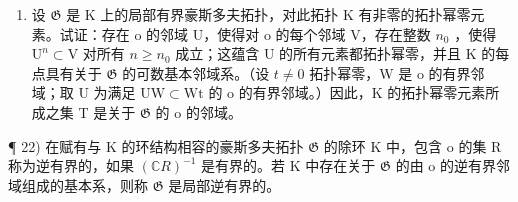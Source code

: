 \begin{enumerate}
\def\labelenumi{\alph{enumi})}
\setcounter{enumi}{1}
\tightlist
\item
  设 \(\mathfrak{G}\) 是 K 上的局部有界豪斯多夫拓扑，对此拓扑 K 有非零的拓扑幂零元素。试证：存在 o 的邻域 U，使得对 o 的每个邻域 V，存在整数 \(n_0\) ，使得 \(\mathrm{U}^n\subset \mathrm{V}\) 对所有 \(n\geqslant n_0\) 成立；这蕴含 U 的所有元素都拓扑幂零，并且 K 的每点具有关于 \(\mathfrak{G}\) 的可数基本邻域系。（设 \(t\neq 0\) 拓扑幂零，W 是 o 的有界邻域；取 U 为满足 \(\mathrm{UW}\subset \mathrm{Wt}\) 的 o 的有界邻域。）因此，K 的拓扑幂零元素所成之集 T 是关于 \(\mathfrak{G}\) 的 o 的邻域。
\end{enumerate}

¶ 22) 在赋有与 K 的环结构相容的豪斯多夫拓扑 \(\mathfrak{G}\) 的除环 K 中，包含 o 的集 R 称为逆有界的，如果 \((\mathbb{C}R)^{-1}\) 是有界的。若 K 中存在关于 \(\mathfrak{G}\) 的由 o 的逆有界邻域组成的基本系，则称 \(\mathfrak{G}\) 是局部逆有界的。

